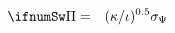\begin{eqnarray}
\ifnumSw \Pi & = &  (\kappa/\iota)^{0.5} \sigma_{\Psi} \label{eq:bestPi}
\end{eqnarray}
